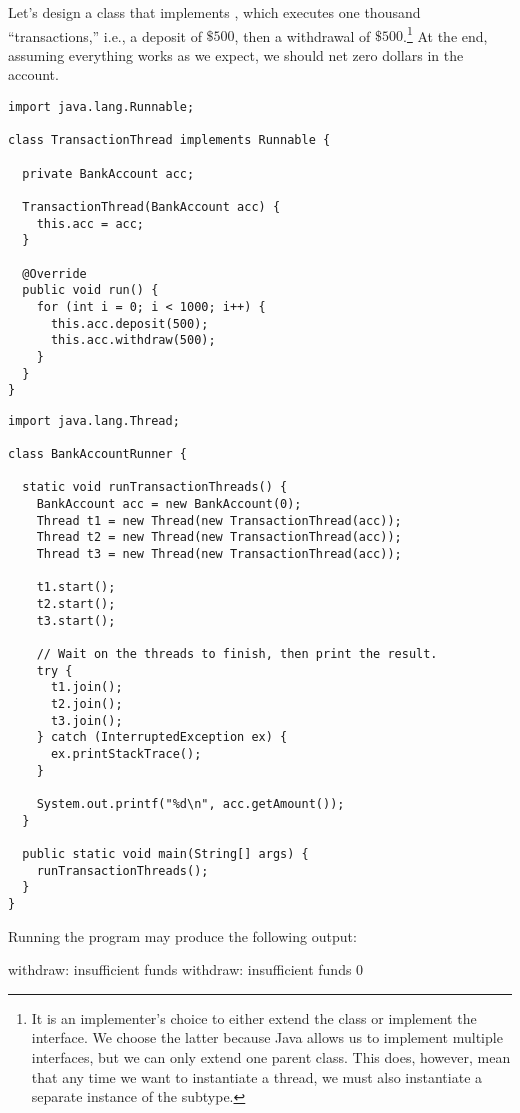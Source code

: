 Let's design a  class that implements , which executes one thousand ``transactions,'' i.e., a deposit of $\$500$, then a withdrawal of $\$500$.\footnote{It is an implementer's choice to either extend the  class or implement the  interface. We choose the latter because Java allows us to implement multiple interfaces, but we can only extend one parent class. This does, however, mean that any time we want to instantiate a thread, we must also instantiate a separate instance of the  subtype.} 
At the end, assuming everything works as we expect, we should net zero dollars in the account.

\begin{lstlisting}[language=MyJava]
import java.lang.Runnable;

class TransactionThread implements Runnable {

  private BankAccount acc;

  TransactionThread(BankAccount acc) { 
    this.acc = acc; 
  }

  @Override
  public void run() {
    for (int i = 0; i < 1000; i++) {
      this.acc.deposit(500);
      this.acc.withdraw(500);
    }
  }
}
\end{lstlisting}

\begin{lstlisting}[language=MyJava]
import java.lang.Thread;

class BankAccountRunner {

  static void runTransactionThreads() {
    BankAccount acc = new BankAccount(0);
    Thread t1 = new Thread(new TransactionThread(acc));
    Thread t2 = new Thread(new TransactionThread(acc));
    Thread t3 = new Thread(new TransactionThread(acc));

    t1.start();
    t2.start();
    t3.start();

    // Wait on the threads to finish, then print the result.
    try {
      t1.join();
      t2.join();
      t3.join();
    } catch (InterruptedException ex) { 
      ex.printStackTrace(); 
    }

    System.out.printf("%d\n", acc.getAmount());
  }

  public static void main(String[] args) {
    runTransactionThreads();
  }
}
\end{lstlisting}

Running the program may produce the following output:

\begin{verbnobox}[\small]
withdraw: insufficient funds
withdraw: insufficient funds
0
\end{verbnobox}

